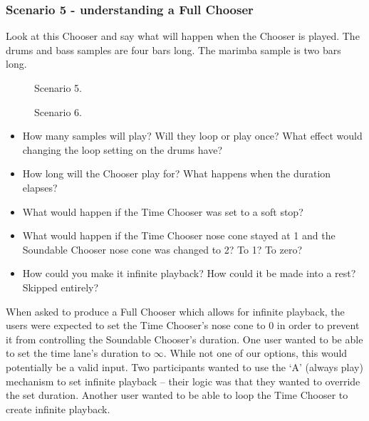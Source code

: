 \documentclass{ppig}
\begin{document}
\hypertarget{sec:scenariofive}{%
\subsubsection{Scenario 5 - understanding a Full
Chooser}\label{sec:scenariofive}}

Look at this Chooser and say what will happen when the Chooser is
played. The drums and bass samples are four bars long. The marimba
sample is two bars long.


\begin{figure}[!h]
	\begin{floatrow}
			{\caption{Scenario 5.}\label{fig:scenario5}}
			{\caption{Scenario 6.}\label{fig:scenario6}}
	\end{floatrow}
\end{figure}

\begin{itemize}
\item
  How many samples will play? Will they loop or play once? What effect
  would changing the loop setting on the drums have?
\item
  How long will the Chooser play for? What happens when the duration
  elapses?
\item
  What would happen if the Time Chooser was set to a soft stop?
\item
  What would happen if the Time Chooser nose cone stayed at 1 and the
  Soundable Chooser nose cone was changed to 2? To 1? To zero?
\item
  How could you make it infinite playback? How could it be made into a
  rest? Skipped entirely?
\end{itemize}

When asked to produce a Full Chooser which allows for infinite playback,
the users were expected to set the Time Chooser's nose cone to 0 in
order to prevent it from controlling the Soundable Chooser's duration.
One user wanted to be able to set the time lane's duration to
\(\infty\). While not one of our options, this would potentially be a
valid input. Two participants wanted to use the `A' (always play)
mechanism to set infinite playback -- their logic was that they wanted
to override the set duration. Another user wanted to be able to loop the
Time Chooser to create infinite playback.
\end{document}
